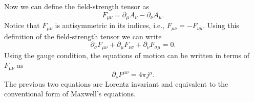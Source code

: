 \documentclass{article}
\begin{document}
Now we can define the field-strength tensor as \begin{equation} F_{\mu \nu} = \partial_\mu A_\nu - \partial_\nu A_\mu . \end{equation} Notice that $F_{\mu \nu}$ is antisymmetric in its indices, i.e., $F_{\mu \nu} = - F_{\nu \mu}$. Using this definition of the field-strength tensor we can write \begin{equation} \partial_\sigma F_{\mu \nu} + \partial_\mu F_{\nu \sigma} + \partial_\nu F_{\sigma \mu} = 0 . \end{equation} Using the gauge condition, the equations of motion can be written in terms of $F_{\mu \nu}$ as \begin{equation} \partial_\nu F^{\mu \nu} = 4 \pi j^\mu . \end{equation} The previous two equations are Lorentz invariant and equivalent to the conventional form of Maxwell's equations.
\end{document}

